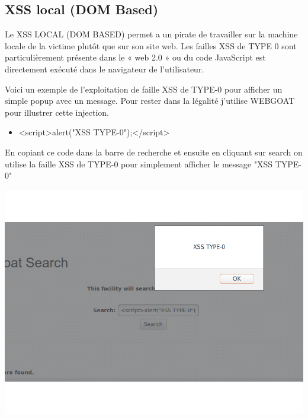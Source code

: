 \bigskip

\subsection{XSS local (DOM Based)}\label{vulnerabilites:web:xss:dom}

Le XSS LOCAL (DOM BASED) permet a un pirate de travailler sur la machine locale de la victime plutôt que sur son site web. Les failles XSS de TYPE 0 sont particulièrement présente dans le « web 2.0 » ou du code JavaScript est directement exécuté dans le navigateur de l'utilisateur.

\begin{flushleft}
Voici un exemple de l'exploitation de faille XSS de TYPE-0 pour afficher un simple popup avec un message. Pour rester dans la légalité j'utilise WEBGOAT pour illustrer cette injection.
\end{flushleft}

\bigskip

\begin{itemize}
\item <script>alert("XSS TYPE-0");</script>
\end{itemize}

\bigskip

\begin{flushleft}
En copiant ce code dans la barre de recherche et ensuite en cliquant sur search on utilise la faille XSS de TYPE-0 pour simplement afficher le message "XSS TYPE-0"
\end{flushleft}



\begin{center}
\includegraphics[scale=0.3]{Web/assets/XSS0.png}
\end{center}

